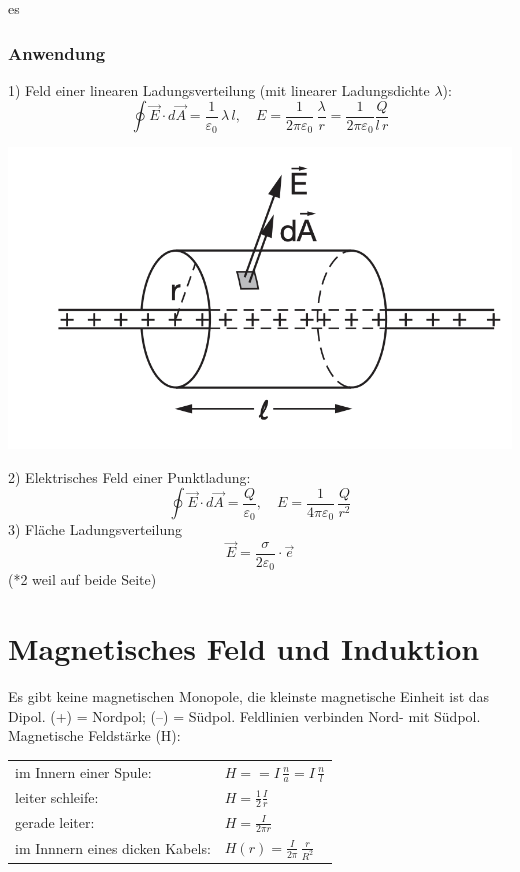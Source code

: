es\documentclass[a4paper, fontsize=8pt, landscape]{scrartcl}
\begin{document}
\begin{multicols*}{4}
    \subsubsection{Anwendung}
    1) Feld einer linearen Ladungsverteilung (mit linearer Ladungsdichte $\lambda$):
    \[\oint \vec E \cdot d\vec A = \frac{1}{\varepsilon_0}\,\lambda\,l,\quad E = \frac{1}{2\pi\varepsilon_0}\,\frac{\lambda}{r} = \frac{1}{2\pi \varepsilon_0} \frac{Q}{l\,r}\]
    \begin{center}
        \includegraphics[scale=0.1]{Images/linLadungs.png}
    \end{center}
    2) Elektrisches Feld einer Punktladung:
    \[\oint \vec E \cdot d\vec A = \frac{Q}{\varepsilon_0},\quad E = \frac{1}{4\pi\varepsilon_0}\,\frac{Q}{r^2}\]
    3) Fläche Ladungsverteilung
    \[\vec E = \frac{\sigma}{2\varepsilon_0} \cdot \vec e\]
    (*2 weil auf beide Seite)
    


\columnbreak
\section{Magnetisches Feld und Induktion}
Es gibt keine magnetischen Monopole, die kleinste magnetische Einheit ist das Dipol. (+) = Nordpol; (–) = Südpol. Feldlinien verbinden Nord- mit Südpol.\\
Magnetische Feldstärke (H):\\
\begin{tabular}[t]{@{}l l}
    im Innern einer Spule: &$H = = I\,\frac{n}{a} = I\,\frac{n}{l}$\\
    leiter schleife: &$H = \frac{1}{2} \frac{I}{r}$\\
    gerade leiter: &$H=\frac{I}{2 \pi r}$\\
    im Innnern eines dicken Kabels: &$H(r) = \frac{I}{2\pi}\,\frac{r}{R^2}$
    \end{tabular}
    \vspace{3em}


\end{multicols*}
\end{document}
